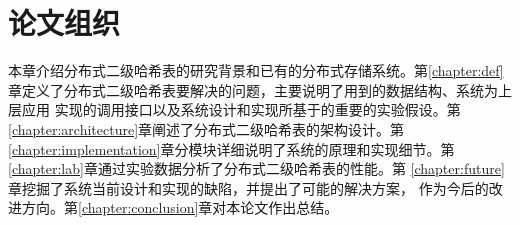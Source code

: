 \section{论文组织}
本章介绍分布式二级哈希表的研究背景和已有的分布式存储系统。第\ref{chapter:def}
章定义了分布式二级哈希表要解决的问题，主要说明了用到的数据结构、系统为上层应用
实现的调用接口以及系统设计和实现所基于的重要的实验假设。第
\ref{chapter:architecture}章阐述了分布式二级哈希表的架构设计。第
\ref{chapter:implementation}章分模块详细说明了系统的原理和实现细节。第
\ref{chapter:lab}章通过实验数据分析了分布式二级哈希表的性能。第
\ref{chapter:future}章挖掘了系统当前设计和实现的缺陷，并提出了可能的解决方案，
作为今后的改进方向。第\ref{chapter:conclusion}章对本论文作出总结。
